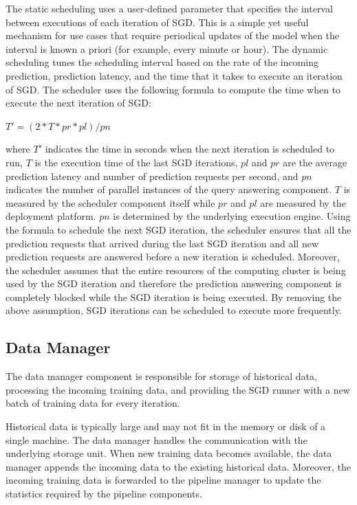 The static scheduling uses a user-defined parameter that specifies the interval between executions of each iteration of SGD.
This is a simple yet useful mechanism for use cases that require periodical updates of the model when the interval is known a priori (for example, every minute or hour). 
The dynamic scheduling tunes the scheduling interval based on the rate of the incoming prediction, prediction latency, and the time that it takes to execute an iteration of SGD.
The scheduler uses the following formula to compute the time when to execute the next iteration of SGD:
\begin{center}
$T' = (2 * T * pr * pl) / pn$
\end{center}
where $T'$ indicates the time in seconds when the next iteration is scheduled to run, $T$ is the execution time of the last SGD iterations, $pl$ and $pr$ are the average prediction latency and number of prediction requests per second, and $pn$ indicates the number of parallel instances of the query answering component.
$T$ is measured by the scheduler component itself while $pr$ and $pl$ are measured by the deployment platform.
$pn$ is determined by the underlying execution engine.
Using the formula to schedule the next SGD iteration, the scheduler ensures that all the prediction requests that arrived during the last SGD iteration and all new prediction requests are answered before a new iteration is scheduled.
Moreover, the scheduler assumes that the entire resources of the computing cluster is being used by the SGD iteration and therefore the prediction answering component is completely blocked while the SGD iteration is being executed.
By removing the above assumption, SGD iterations can be scheduled to execute more frequently.

\subsection{Data Manager} \label{data-manager}
The data manager component is responsible for storage of historical data, processing the incoming training data, and providing the SGD runner with a new batch of training data for every iteration.

Historical data is typically large and may not fit in the memory or disk of a single machine. 
The data manager handles the communication with the underlying storage unit.
When new training data becomes available, the data manager appends the incoming data to the existing historical data.
Moreover, the incoming training data is forwarded to the pipeline manager to update the statistics required by the pipeline components.

